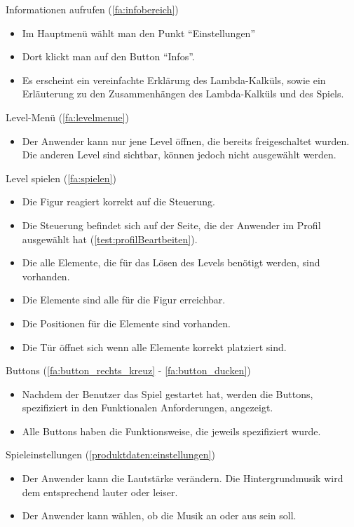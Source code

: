 \documentclass{scrartcl}
\begin{document}
\begin{telist}
	\item{Informationen aufrufen} \label{szenarien:infomartionen_aufrufen} (\ref{fa:infobereich})
	\begin{itemize}
		\item Im Hauptmenü wählt man den Punkt \enquote{Einstellungen}
		\item Dort klickt man auf den Button \enquote{Infos}.
		\item Es erscheint ein vereinfachte Erklärung des Lambda-Kalküls, sowie ein Erläuterung zu den Zusammenhängen des Lambda-Kalküls und des Spiels.
	\end{itemize}
	
	\item Level-Menü (\ref{fa:levelmenue})
	\begin{itemize}
		\item Der Anwender kann nur jene Level öffnen, die bereits freigeschaltet wurden. Die anderen Level sind sichtbar, können jedoch nicht ausgewählt werden.
	\end{itemize}
	
	\item Level spielen (\ref{fa:spielen})
	\begin{itemize}
		\item Die Figur reagiert korrekt auf die Steuerung.
		\item Die Steuerung befindet sich auf der Seite, die der Anwender im Profil ausgewählt hat (\ref{test:profilBeartbeiten}).
		\item Die alle Elemente, die für das Lösen des Levels benötigt werden, sind vorhanden.
		\item Die Elemente sind alle für die Figur erreichbar.
		\item Die Positionen für die Elemente sind vorhanden.
		\item Die Tür öffnet sich wenn alle Elemente korrekt platziert sind.
	\end{itemize}
	
	\item Buttons (\ref{fa:button_rechts_kreuz} - \ref{fa:button_ducken})
	\begin{itemize}
		\item Nachdem der Benutzer das Spiel gestartet hat, werden die Buttons, spezifiziert in den Funktionalen Anforderungen, angezeigt.
		\item Alle Buttons haben die Funktionsweise, die jeweils spezifiziert wurde.
	\end{itemize}
	
	\item Spieleinstellungen (\ref{produktdaten:einstellungen})
	\begin{itemize}
		\item Der Anwender kann die Lautstärke verändern. Die Hintergrundmusik wird dem entsprechend lauter oder leiser.
		\item Der Anwender kann wählen, ob die Musik an oder aus sein soll.
	\end{itemize}
	

\end{telist}
\end{document}
